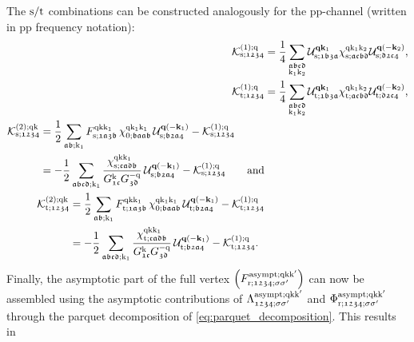 \documentclass[../../main.tex]{subfiles}
\begin{document}
The $\text{s}/\text{t}$ combinations can be constructed analogously for the pp-channel (written in pp frequency notation):
\begin{subequations}\label{eq:kernel_functions_sing_trip}
\begin{align}
	\mathcal{K}^{(1);\text{q}}_{\text{s};\mathfrak{1234}}&=\frac14\sum_{\substack{\mathfrak{abcd}\\\text{k}_1\text{k}_2}} \mathcal{U}^{\textbf{q}\textbf{k}_1}_{\text{s};\mathfrak{1b3a}} \chi^{\text{q}\text{k}_1\text{k}_2}_{\text{s};\mathfrak{acbd}} \mathcal{U}^{\textbf{q}(-\textbf{k}_2)}_{\text{s};\mathfrak{d2c4}},\\
	\mathcal{K}^{(1);\text{q}}_{\text{t};\mathfrak{1234}}&=\frac14\sum_{\substack{\mathfrak{abcd}\\\text{k}_1\text{k}_2}} \mathcal{U}^{\textbf{q}\textbf{k}_1}_{\text{t};\mathfrak{1b3a}} \chi^{\text{q}\text{k}_1\text{k}_2}_{\text{t};\mathfrak{acbd}} \mathcal{U}^{\textbf{q}(-\textbf{k}_2)}_{\text{t};\mathfrak{d2c4}},\\
\begin{split}
	\mathcal{K}^{(2);\text{q}\text{k}}_{\text{s};\mathfrak{1234}}&=\frac12\sum_{\mathfrak{ab};\text{k}_1} F^{\text{q}\text{k}\text{k}_1}_{\text{s};\mathfrak{1a3b}}\,\chi^{\text{q}\text{k}_1\text{k}_1}_{0;\mathfrak{baab}}\,\mathcal{U}^{\textbf{q}(-\textbf{k}_1)}_{\text{s};\mathfrak{b2a4}}-\mathcal{K}^{(1);\text{q}}_{\text{s};\mathfrak{1234}}\\
	&=-\frac12\sum_{\mathfrak{abcd};\text{k}_1} \frac{\chi^{\text{q}\text{k}\text{k}_1}_{\text{s};\mathfrak{cadb}}}{G^{\text{k}}_{\mathfrak{1c}}G^{-\text{q}}_{\mathfrak{3d}}}\,\mathcal{U}^{\textbf{q}(-\textbf{k}_1)}_{\text{s};\mathfrak{b2a4}}-\mathcal{K}^{(1);\text{q}}_{\text{s};\mathfrak{1234}}\qquad\text{and}
\end{split}\\
\begin{split}
	\mathcal{K}^{(2);\text{q}\text{k}}_{\text{t};\mathfrak{1234}}&=\frac12\sum_{\mathfrak{ab};\text{k}_1} F^{\text{q}\text{k}\text{k}_1}_{\text{t};\mathfrak{1a3b}}\,\chi^{\text{q}\text{k}_1\text{k}_1}_{0;\mathfrak{baab}}\,\mathcal{U}^{\textbf{q}(-\textbf{k}_1)}_{\text{t};\mathfrak{b2a4}}-\mathcal{K}^{(1);\text{q}}_{\text{t};\mathfrak{1234}}\\
	&=-\frac12\sum_{\mathfrak{abcd};\text{k}_1} \frac{\chi^{\text{q}\text{k}\text{k}_1}_{\text{t};\mathfrak{cadb}}}{G^{\text{k}}_{\mathfrak{1c}}G^{-\text{q}}_{\mathfrak{3d}}}\,\mathcal{U}^{\textbf{q}(-\textbf{k}_1)}_{\text{t};\mathfrak{b2a4}}-\mathcal{K}^{(1);\text{q}}_{\text{t};\mathfrak{1234}}.
\end{split}
\end{align}	
\end{subequations}
Finally, the asymptotic part of the full vertex $\left (F_{\text{r};\mathfrak{1234};\sigma\sigma'}^{\text{asympt};\text{q}\text{k}\text{k}'}\right )$ can now be assembled using the asymptotic contributions of $\Lambda^{\text{asympt};\text{q}\text{k}\text{k}'}_{\mathfrak{1234};\sigma\sigma'}$ and $\Phi_{\text{r};\mathfrak{1234};\sigma\sigma'}^{\text{asympt};\text{q}\text{k}\text{k}'}$ through the parquet decomposition of \eqref{eq:parquet_decomposition}. This results in
\end{document}
